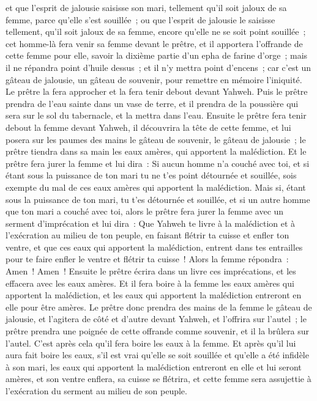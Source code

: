 \begin{multicols}{2}
et que l'esprit de jalousie saisisse son mari, tellement qu'il soit jaloux de sa femme, parce qu'elle s'est souillée~; ou que l'esprit de jalousie le saisisse tellement, qu'il soit jaloux de sa femme, encore qu'elle ne se soit point souillée~;
cet homme-là fera venir sa femme devant le prêtre, et il apportera l'offrande de cette femme pour elle, savoir la dixième partie d'un epha de farine d'orge~; mais il ne répandra point d'huile dessus~; et il n'y mettra point d'encens~; car c'est un gâteau de jalousie, un gâteau de souvenir, pour remettre en mémoire l'iniquité.
Le prêtre la fera approcher et la fera tenir debout devant Yahweh.
Puis le prêtre prendra de l'eau sainte dans un vase de terre, et il prendra de la poussière qui sera sur le sol du tabernacle, et la mettra dans l'eau.
Ensuite le prêtre fera tenir debout la femme devant Yahweh, il découvrira la tête de cette femme, et lui posera sur les paumes des mains le gâteau de souvenir, le gâteau de jalousie~; le prêtre tiendra dans sa main les eaux amères, qui apportent la malédiction.
Et le prêtre fera jurer la femme et lui dira~: Si aucun homme n'a couché avec toi, et si étant sous la puissance de ton mari tu ne t'es point détournée et souillée, sois exempte du mal de ces eaux amères qui apportent la malédiction.
Mais si, étant sous la puissance de ton mari, tu t'es détournée et souillée, et si un autre homme que ton mari a couché avec toi,
alors le prêtre fera jurer la femme avec un serment d'imprécation et lui dira~: Que Yahweh te livre à la malédiction et à l'exécration au milieu de ton peuple, en faisant flétrir ta cuisse et enfler ton ventre,
et que ces eaux qui apportent la malédiction, entrent dans tes entrailles pour te faire enfler le ventre et flétrir ta cuisse~! Alors la femme répondra~: Amen~! Amen~!
Ensuite le prêtre écrira dans un livre ces imprécations, et les effacera avec les eaux amères.
Et il fera boire à la femme les eaux amères qui apportent la malédiction, et les eaux qui apportent la malédiction entreront en elle pour être amères.
Le prêtre donc prendra des mains de la femme le gâteau de jalousie, et l'agitera de côté et d'autre devant Yahweh, et l'offrira sur l'autel~;
le prêtre prendra une poignée de cette offrande comme souvenir, et il la brûlera sur l'autel. C'est après cela qu'il fera boire les eaux à la femme.
Et après qu'il lui aura fait boire les eaux, s'il est vrai qu'elle se soit souillée et qu'elle a été infidèle à son mari, les eaux qui apportent la malédiction entreront en elle et lui seront amères, et son ventre enflera, sa cuisse se flétrira, et cette femme sera assujettie à l'exécration du serment au milieu de son peuple.

\end{multicols}
